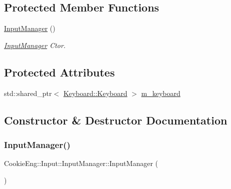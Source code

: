 \subsection*{Protected Member Functions}
\begin{DoxyCompactItemize}
\item 
\hyperlink{class_cookie_eng_1_1_input_1_1_input_manager_a6464eabb341068379430b90ec922047a}{Input\+Manager} ()
\begin{DoxyCompactList}\small\item\em \hyperlink{class_cookie_eng_1_1_input_1_1_input_manager}{Input\+Manager} Ctor. \end{DoxyCompactList}\end{DoxyCompactItemize}
\subsection*{Protected Attributes}
\begin{DoxyCompactItemize}
\item 
std\+::shared\+\_\+ptr$<$ \hyperlink{class_cookie_eng_1_1_input_1_1_keyboard_1_1_keyboard}{Keyboard\+::\+Keyboard} $>$ \hyperlink{class_cookie_eng_1_1_input_1_1_input_manager_aa8137e98a8515c6da82cd3ca4f2f04bf}{m\+\_\+keyboard}
\end{DoxyCompactItemize}


\subsection{Constructor \& Destructor Documentation}
\mbox{\label{class_cookie_eng_1_1_input_1_1_input_manager_a6464eabb341068379430b90ec922047a}} 
\subsubsection{\texorpdfstring{Input\+Manager()}{InputManager()}}
{\footnotesize\ttfamily Cookie\+Eng\+::\+Input\+::\+Input\+Manager\+::\+Input\+Manager (\begin{DoxyParamCaption}{ }\end{DoxyParamCaption})\hspace{0.3cm}{\ttfamily [protected]}}



